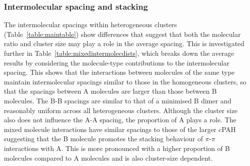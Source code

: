 \subsubsection{Intermolecular spacing and stacking}
The intermolecular spacings within heterogeneous clusters (Table~\ref{table:maintable}) show differences that suggest that both the molecular ratio and cluster size may play a role in the average spacing. This is investigated further in Table~\ref{table:mixedintermolecdists}, which breaks down the average results by considering the molecule-type contributions to the intermolecular spacing. This shows that the interactions between molecules of the same type maintain intermolecular spacings similar to those in the homogeneous clusters, so that the spacings between A molecules are larger than those between B molecules. The B-B spacings are similar to that of a minimised B dimer and reasonably uniform across all heterogeneous clusters.  %
Although the cluster size also does not influence the A-A spacing, the proportion of A plays a role. The mixed molecule interactions have similar spacings to those of the larger cPAH suggesting that the B molecule promotes the stacking behaviour of $\pi$-$\pi$ interactions with A. This is more pronounced with a higher proportion of B molecules compared to A molecules and is also cluster-size dependent. 

